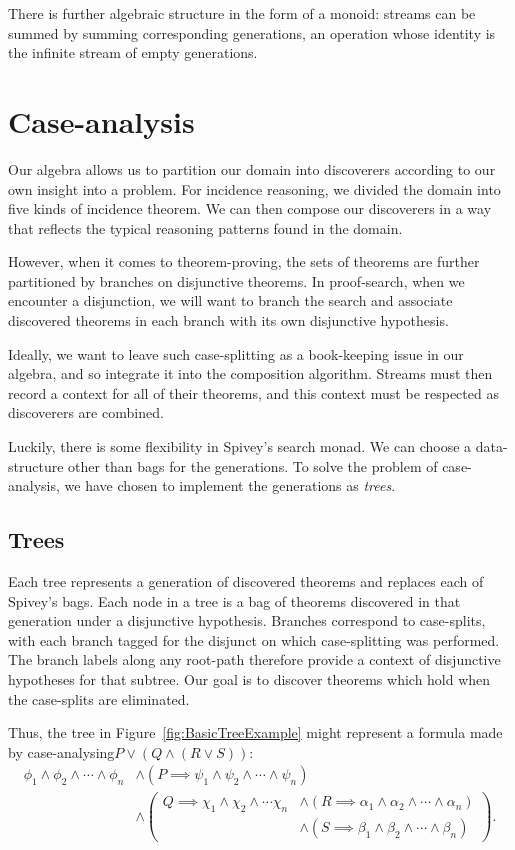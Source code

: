 There is further algebraic structure in the form of a monoid: streams can be summed by summing corresponding generations, an operation whose identity is the infinite stream of empty generations. 

\section{Case-analysis}
Our algebra allows us to partition our domain into discoverers according to our own insight into a problem. For incidence reasoning, we divided the domain into five kinds of incidence theorem. We can then compose our discoverers in a way that reflects the typical reasoning patterns found in the domain.

However, when it comes to theorem-proving, the sets of theorems are further partitioned by branches on disjunctive theorems. In proof-search, when we encounter a disjunction, we will want to branch the search and associate discovered theorems in each branch with its own disjunctive hypothesis. 

Ideally, we want to leave such case-splitting as a book-keeping issue in our algebra, and so integrate it into the composition algorithm. Streams must then record a context for all of their theorems, and this context must be respected as discoverers are combined. 

Luckily, there is some flexibility in Spivey's search monad. We can choose a data-structure other than bags for the generations. To solve the problem of case-analysis, we have chosen to implement the generations as \emph{trees}. 

\subsection{Trees}\label{sec:Trees}
Each tree represents a generation of discovered theorems and replaces each of Spivey's bags. Each node in a tree is a bag of theorems discovered in that generation under a disjunctive hypothesis. Branches correspond to case-splits, with each branch tagged for the disjunct on which case-splitting was performed. The branch labels along any root-path therefore provide a context of disjunctive hypotheses for that subtree. Our goal is to discover theorems which hold when the case-splits are eliminated.

Thus, the tree in Figure~\ref{fig:BasicTreeExample} might represent a formula made by case-analysing\linebreak \mbox{$P \vee (Q \wedge (R \vee S))$}:
\begin{align*}
\phi_1 \wedge \phi_2 \wedge \cdots \wedge \phi_n &\wedge (P \implies \psi_1 \wedge \psi_2 \wedge \cdots \wedge \psi_n)\\
&\wedge \left(\begin{aligned} Q \implies \chi_1 \wedge \chi_2 \wedge \cdots \chi_n &\wedge (R \implies \alpha_1 \wedge \alpha_2 \wedge \cdots \wedge \alpha_n)\\ &\wedge (S \implies \beta_1 \wedge \beta_2 \wedge \cdots \wedge \beta_n)\end{aligned}\right).
\end{align*}

